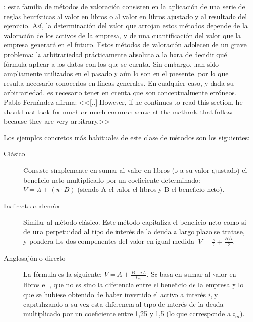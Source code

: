 \documentclass{nuevotema}
\begin{document}
: esta familia de métodos de valoración consisten en la aplicación de una serie de reglas heurísticas al valor en libros o al valor en libros ajustado y al resultado del ejercicio. Así, la determinación del valor que arrojan estos métodos depende de la valoración  de los activos de la empresa, y de una cuantificación del valor que la empresa generará en el futuro. Estos métodos de valoración adolecen de un grave problema: la arbitrariedad prácticamente absoluta a la hora de decidir qué fórmula aplicar a los datos con los que se cuenta. Sin embargo, han sido ampliamente utilizados en el pasado y aún lo son en el presente, por lo que resulta necesario conocerlos en líneas generales. En cualquier caso, y dada su arbitrariedad, es necesario tener en cuenta que son conceptualmente erróneos. Pablo Fernández afirma: <<[..] However, if he continues to read this section, he should not look for much  or much common sense at the methods that follow because they are very arbitrary.>>

Los ejemplos concretos más habituales de este clase de métodos son los siguientes:

\begin{description}
	\item[Clásico] Consiste simplemente en sumar al valor en libros (o a su valor ajustado) el beneficio neto multiplicado por un coeficiente determinado: $V = A + (n \cdot B)$ (siendo A el valor el libros y B el beneficio neto).
	
	\item[Indirecto o alemán] Similar al método clásico. Este método capitaliza el beneficio neto como si de una perpetuidad al tipo de interés de la deuda a largo plazo se tratase, y pondera los dos componentes del valor en igual medida: $V = \frac{A}{2} + \frac{B/i}{2}$.
	
	\item[Anglosajón o directo] La fórmula es la siguiente: $V = A + \frac{B- iA}{t_m}$. Se basa en sumar al valor en libros el , que no es sino la diferencia entre el beneficio de la empresa y lo que se hubiese obtenido de haber invertido el activo a interés $i$, y capitalizando a su vez esta diferencia al tipo de interés de la deuda multiplicado por un coeficiente entre 1,25 y 1,5 (lo que corresponde a $t_m$).
\end{description}

\end{document}
